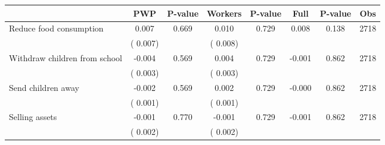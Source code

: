 
\begin{tabular}{l*{7}{c}}\hline&\multicolumn{1}{c}{PWP}&\multicolumn{1}{c}{P-value}&\multicolumn{1}{c}{Workers}&\multicolumn{1}{c}{P-value}&\multicolumn{1}{c}{Full}&\multicolumn{1}{c}{P-value}&\multicolumn{1}{c}{Obs} \\ \hline

 Reduce food consumption       &              0.007       &        0.669  &              0.010       &        0.729  &              0.008       &              0.138 &  2718 \\ 
                       &       (       0.007)             &                               &       (       0.008)                     &                               &                                               &                                &                      \\ 

 Withdraw children from school       &             -0.004       &        0.569  &              0.004       &        0.729  &             -0.001       &              0.862 &  2718 \\ 
                       &       (       0.003)             &                               &       (       0.003)                     &                               &                                               &                                &                      \\ 

 Send children away       &             -0.002       &        0.569  &              0.002       &        0.729  &             -0.000       &              0.862 &  2718 \\ 
                       &       (       0.001)             &                               &       (       0.001)                     &                               &                                               &                                &                      \\ 

 Selling assets       &             -0.001       &        0.770  &             -0.001       &        0.729  &             -0.001       &              0.862 &  2718 \\ 
                       &       (       0.002)             &                               &       (       0.002)                     &                               &                                               &                                &                      \\ 


\end{tabular}
